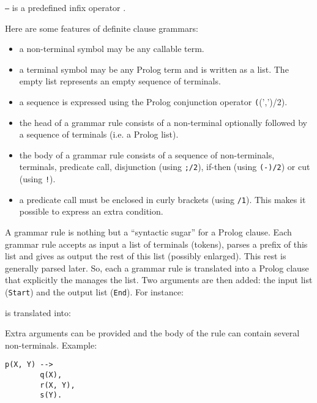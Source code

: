 \texttt{--{\gt}} is a predefined infix operator .

Here are some features of definite clause grammars:

\begin{itemize}

\item a non-terminal symbol may be any callable term.

\item a terminal symbol may be any Prolog term and is written as a list. The
  empty list represents an empty sequence of terminals.

\item a sequence is expressed using the Prolog conjunction operator
  \texttt((',')/2).

\item the head of a grammar rule consists of a non-terminal optionally
  followed by a sequence of terminals (i.e. a Prolog list).

\item the body of a grammar rule consists of a sequence of non-terminals,
  terminals, predicate call, disjunction (using \texttt{;/2}), if-then (using
  \texttt{(-{\gt})/2}) or cut (using \texttt{!}).

\item a predicate call must be enclosed in curly brackets (using
  \texttt{{\lb}{\rb}/1}). This makes it possible to express an extra
  condition.

\end{itemize}

A grammar rule is nothing but a ``syntactic sugar'' for a Prolog clause. Each
grammar rule accepts as input a list of terminals (tokens), parses a prefix
of this list and gives as output the rest of this list (possibly enlarged).
This rest is generally parsed later. So, each a grammar rule is translated
into a Prolog clause that explicitly the manages the list. Two arguments
are then added: the input list (\texttt{Start}) and the output list
(\texttt{End}). For instance:


is translated into:


Extra arguments can be provided and the body of the rule can contain several
non-terminals. Example:

\begin{Indentation}
\begin{verbatim}
p(X, Y) -->
        q(X),
        r(X, Y),
        s(Y).
\end{verbatim}
\end{Indentation}

